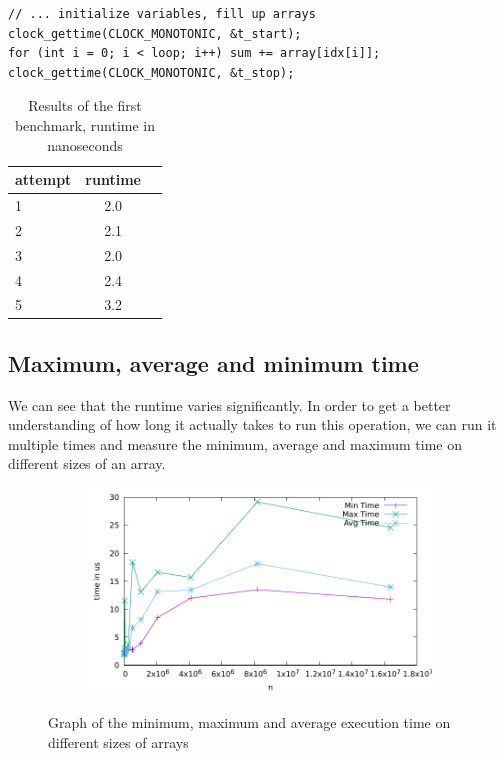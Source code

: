 \documentclass[a4paper,11pt]{article}
\begin{document}
\begin{verbatim}
// ... initialize variables, fill up arrays
clock_gettime(CLOCK_MONOTONIC, &t_start);
for (int i = 0; i < loop; i++) sum += array[idx[i]];
clock_gettime(CLOCK_MONOTONIC, &t_stop);
\end{verbatim}
\begin{table}[H]
  \begin{center}
    \begin{tabular}{l|c|c}
      \textbf{attempt} & \textbf{runtime}\\
      \hline
      1      &  2.0\\
      2      &  2.1\\
      3      &  2.0\\
      4      &  2.4\\
      5      &  3.2\\
    \end{tabular}
    \caption{Results of the first benchmark, runtime in nanoseconds}
    \label{tab:table1}
  \end{center}
\end{table}

\subsection*{Maximum, average and minimum time}
We can see that the runtime varies significantly.
In order to get a better understanding of how long it actually takes to run this operation, we can run it multiple times and measure the minimum, average and maximum time on different sizes of an array.

\begin{figure}[h]
  \centering
  \begin{subfigure}[b]{.5\textwidth}
    \centering
    \includegraphics[width=\textwidth]{./graph_1/data} %
  \end{subfigure}
  \caption{Graph of the minimum, maximum and average execution time on different sizes of arrays}
  \label{fig:graph_1}
\end{figure}
\end{document}
